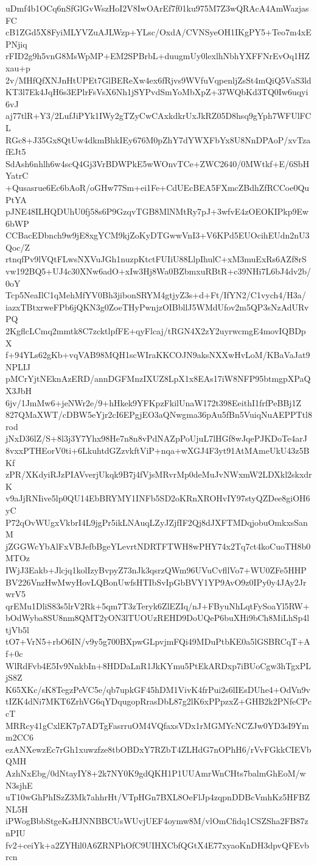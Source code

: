 uDmf4b1OCq6nSfGlGvWszHoI2V8IwOArEf7f01ku975M7Z3wQRAcA4AmWazjasFC
cB1ZGd5X8FyiMLYVZuAJLWzp+YLsc/OxdA/CVNSyeOH1IKgPY5+Teo7m4xEPNjiq
rFID2g9h5vnG8MsWpMP+EM2SPBrbL+duugmUy0lexlhNbhYXFFNrEvOq1HZxau+p
2v/MHfQfXNJnHtUPEt7GlBEReXw4ex6fRjvs9WVfuVqpenljZsSt4mQiQ5VaS3ld
KT3l7Ek4JqH6s3EPlrFsVsX6Nh1jSYPvdSmYoMbXpZ+37WQbKd3TQ0Iw6uqyi6vJ
aj77tlR+Y3/2LufJiPYk1IWy2gTZyCwCAxkdkrUxJkRZ05D8hsq9gYph7WFUlFCL
RGc8+J35Gx8QtUw4dkmBhkIEy676M0pZhY7dYWXFbYx8U8NnDPAoP/xvTzafEJt5
SdAsh6nhlh6w4scQ4Gj3VrBDWPkE5wWOnvTCe+ZWC2640/0MWtkf+E/6SbHYatrC
+Qusasrue6Ec6bAoR/oGHw77Sm+ei1Fe+CdUEcBEA5FXmcZBdhZfRCCoe0QuPtYA
pJNE48ILHQDUhU0fj58s6P9GzqvTGB8MlNMtRy7pJ+3wfvE4zOEOKIPkp9Ew6bWP
CCBacEDbnch9w9jE8xgYCM9kjZoKyDTGwwVnI3+V6KPd5EUOcihEUdn2nU3Qoc/Z
rtnqfPv9lVQtFLwsNXVuJGh1nuzpKtctFUIiU88LlpIhulC+xM3muExRs6AZf8rS
vw192BQ5+UJ4c30XNw6adO+xIw3Hj8Wa0BZbmxuRBtR+c39NHi7L6bJ4dv2b/0oY
Tcp5NeaIlC1qMehMfYV0Bh3jibonSRYM4gtjyZ3s+d+Ft/IfYN2/C1vych4/H3a/
iazxTBtxrweFPb6jQKN3g0ZoeTHyPwnjzOIBbllJ5WMdUfov2m5QP3sNzAdURvPQ
2KgflcLCmq2mmtk8C7zcktlpfFE+qyFlcaj/tRGN4X2zY2uyrwcmgE4movIQBDpX
f+94YLs62gKb+vqVAB98MQH1scWIraKKCOJN9aksNXXwHvLoM/KBaVaJat9NPLIJ
pMCrYjtNEknAzERD/annDGFMnzIXUZ8LpX1x8EAs17iW8NFP95btmgpXPaQX3JbH
6jv/1JmMw6+jeNWr2e/9+hHkek9YFKpzFkilUnaW172t398EeithI1frfPeBBj1Z
827QMaXWT/cDBW5eYjr2cI6EPgjEO3aQNwgma36pAu5fBn5VuiqNuAEPPTtl8rod
jNxD36lZ/S+8l3j3Y7Yhx98He7n8n8vPdNAZpPoUjuL7lHGf8wJqePJKDoTe4arJ
8vxxPTHEorV0ti+6LkuhtdGZzvkftViP+nqa+wXGJ4F3yt91AtMAmeUkU43z5BKf
zPR/XKdyiRJzPIAVverjUkqk9B7j4fVjsMRvrMp0deMuJvNWxmW2LDXkl2skxdrK
v9aJjRNIive5lp0QU14EbBRYMY1INFb5SD2oKRnXROHvIY97styQZDee8giOH6yC
P72qOvWUgxVkbrI4L9jgPr5ikLNAuqLZyJZjfIF2Qj8dJXFTMDqjobuOmkxsSanM
jZGGWcYbAlFxVBJefbBgeYLevrtNDRTFTWH8wPHY74x2Tq7ct4koCuoTH8b0MTOz
IWjJ3Eakb+Jlcjq1kolIzyBvpyZ73nJk3qsrzQWm96UVuCvfllVo7+WU0ZFe5HHP
BV226VnzHwMwyHovLQBonUwfsHTIbSvIpGbBVY1YP9AvO9z0IPy0y4JAy2JrwrV5
qrEMu1DliS83s5lrV2Rk+5qm7T3zTeryk6ZlEZIq/nJ+FByuNhLqtFySoaYl5RW+
bOdWyba8SU8nm8QMT2yON3lTUOUzREHD9DoUQeP6buXHi9bCh8MiLhSp4ltjVb5l
tO7+VrN5+rbO6IN/v9y5g700BXpwGLpvjmFQi49MDuPtbKE0a5lGSBRCqT+Af+0c
WlRdFvb4E5Iv9NnkbIn+8HDDaLnR1JkKYmu5PtEkARDxp7iBUoCgw3hTgxPLjS8Z
K65XKc/sK8TegzPeVC5e/qb7upkGF45hDM1VivK4frPui2s6lIEsDUhe4+OdVn9v
tIZK4dNi7MKT6ZrhVG6qYDqugopRrasDbL87g2lK6xPPpzxZ+GHB2k2PNfeCPccT
MRRcy41gCxlEK7p7ADTgFasrruOM4VQfaxsVDx1rMGMYcNCZJw0YD3sI9Ymm2CC6
ezANXewzEc7rGh1xuwzfze8tbOBDxY7RZbT4ZLHdG7nOPhH6/rVvFGkkCIEVbQMH
AzhNxEbg/0dNtayIY8+2k7NY0K9gdQKH1P1UUAmrWnCHts7balmGhEoM/wN3sjhE
uT10wGhPhISzZ3Mk7ahhrHt/VTpHGn7BXL8OeFlJp4zqpnDDBcVmhKz5HFBZNL5H
iPWogBbbStgeKsHJNNBBCUsWUvjUEF4oymw8M/vlOmCfidq1CSZSha2FB87znPIU
fv2+ceiYk+a2ZYHil0A6ZRNPhOfC9UIHXCbfQGtX4E77xyaoKnDH3dpvQFEvbrcn
